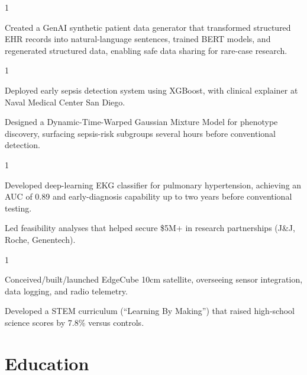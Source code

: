\documentclass[letterpaper, 11pt]{hunter}
\begin{document}
\begin{entryList}{1}
	\item Created a GenAI synthetic patient data generator that transformed structured EHR records into natural-language sentences, trained BERT models, and regenerated structured data, enabling safe data sharing for rare-case research.
\end{entryList}

\begin{entryList}{1}
    \item Deployed early sepsis detection system using XGBoost, with clinical explainer at Naval Medical Center San Diego.
    \item Designed a Dynamic-Time-Warped Gaussian Mixture Model for phenotype discovery, surfacing sepsis-risk subgroups several hours before conventional detection.
\end{entryList}

\begin{entryList}{1}
    \item Developed deep-learning EKG classifier for pulmonary hypertension, achieving an AUC of 0.89 and early-diagnosis capability up to two years before conventional testing.
	\item Led feasibility analyses that helped secure \$5M+ in research partnerships (J\&J, Roche, Genentech).
\end{entryList}

\begin{entryList}{1}
	\item Conceived/built/launched EdgeCube 10cm satellite, overseeing sensor integration, data logging, and radio telemetry.
	\item Developed a STEM curriculum (“Learning By Making”) that raised high-school science scores by 7.8\% versus controls.
\end{entryList}    


\section{Education}
\end{document}
